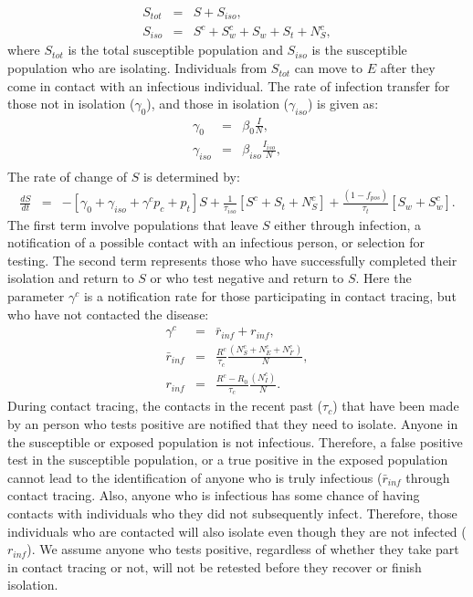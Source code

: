 \documentclass[notitlepage, superscriptaddress]{revtex4-2}
\begin{document}
\begin{eqnarray}
\label{E:Stot}
S_{tot} &=& S + S_{iso}, \\
% 
S_{iso} &=& S^{c} + S^{c}_{w} + S_{w} + S_{t} + N^{c}_{S},
\end{eqnarray}
where $S_{tot}$ is the total susceptible population and $S_{iso}$ is the susceptible population who are isolating. Individuals from $S_{tot}$ can move to $E$ after they come in contact with an infectious individual. The rate of infection transfer for those not in isolation ($\gamma_{0}$), and those in isolation ($\gamma_{iso}$) is given as:
\begin{eqnarray}
\label{E:infectionrates}
\gamma_{0} &=& \beta_0 \frac{I}{N}, \\
% 
\gamma_{iso} &=& \beta_{iso} \frac{I_{iso}}{N}, \\ 
\end{eqnarray}
The rate of change of $S$ is determined by:
\begin{eqnarray}
\label{E:dS}
\frac{dS}{dt} &=& - [\gamma_{0} +\gamma_{iso}  + \gamma^{c} p_{c} +p_{t}] S + \frac{1}{\tau_{iso}}[S^{c} + S_{t} + N^{c}_{S}] + \frac{(1-f_{pos})}{\tau_{t}}[S_{w} + S^{c}_{w}].
\end{eqnarray}
The first term involve populations that leave $S$ either through infection, a notification of a possible contact with an infectious person, or selection for testing. The second term represents those who have successfully completed their isolation and return to $S$ or who test negative and return to $S$. Here the parameter $\gamma^{c}$ is a notification rate for those participating in contact tracing, but who have not contacted the disease:
\begin{eqnarray}
\label{E:notificationrate}
\gamma^{c} &=& \bar{r}_{inf} + r_{inf}, \\
\bar{r}_{inf} &=& \frac{R^{c}}{\tau_{c}} \frac{(N^{c}_{S} + N^{c}_{E} + N^{c}_{I'}) }{N}, \\ 
r_{inf} &=& \frac{R^{c} - R_{0}}{\tau_{c}} \frac{(N^{c}_{I}) }{N}. 
\end{eqnarray}
During contact tracing, the contacts in the recent past ($\tau_{c}$) that have been made by an person who tests positive are notified that they need to isolate. Anyone in the susceptible or exposed population is not infectious. Therefore, a false positive test in the susceptible population, or a true positive in the exposed population cannot lead to the identification of anyone who is truly infectious ($\bar{r}_{inf}$ through contact tracing. Also, anyone who is infectious has some chance of having contacts with individuals who they did not subsequently infect. Therefore, those individuals who are contacted will also isolate even though they are not infected ($r_{inf}$). We assume anyone who tests positive, regardless of whether they take part in contact tracing or not, will not be retested before they recover or finish isolation. 
\end{document}
